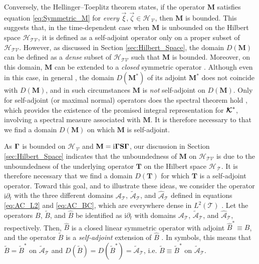 \documentclass[11pt]{amsart}
\newcommand{\I}{\mathrm{i}}
\newcommand{\Mb}{\mathbf{M}}
\newcommand{\Tb}{\mathbf{T}}
\newcommand{\Sb}{\mathbf{S}}
\newcommand\Kbc{\mbox{\boldmath${\mathcal{K}}$}}
\newcommand{\Tc}{\mathcal{T}}
\newcommand{\Vc}{\mathcal{V}}
\newcommand{\Hs}{\mathscr{H}}
\newcommand{\As}{\mathscr{A}}
\newcommand\bGamma{\mbox{\boldmath${\Gamma}$}}
\begin{document}
Conversely, the Hellinger--Toeplitz theorem \cite{Reed-1980} states,
if the operator $\Mb$ satisfies equation \eqref{eq:Symmetric_M} for
\emph{every} $\vec{\xi},\vec{\zeta}\in\Hs_{\,\Vc}$, then $\Mb$ is
bounded. This suggests that, in the time-dependent case when $\Mb$ is
unbounded on the Hilbert space $\Hs_{\Tc\Vc}$, it is defined as a
self-adjoint operator only on a proper subset of
$\Hs_{\Tc\Vc}$. However, as discussed in 
Section \ref{sec:Hilbert_Space}, the domain $D(\Mb)$ can be defined as
a \emph{dense} subset of $\Hs_{\Tc\Vc}$ such that $\Mb$ is
bounded. Moreover, on this domain, $\Mb$ can be extended to a 
\emph{closed} symmetric operator \cite{Reed-1980,Stone:64}. Although
even in this case, in general \cite{Reed-1980}, the domain $D(\Mb^*)$
of its adjoint $\Mb^*$ does not coincide with $D(\Mb)$, and in such
circumstances $\Mb$ is \emph{not} self-adjoint on $D(\Mb)$. Only for
self-adjoint (or maximal normal) operators does the spectral theorem hold
\cite{Reed-1980}, which provides the existence of the promised
integral representation for $\Kbc^*$, involving a spectral measure
associated with $\Mb$. It is therefore necessary to that we find a
domain $D(\Mb)$ on which $\Mb$ is self-adjoint.




As $\bGamma$ is bounded on $\Hs_{\,\Vc}$ and
$\Mb=\I\bGamma\Sb\bGamma$, our discussion in Section
\ref{sec:Hilbert_Space} indicates that the unboundedness of $\Mb$ on
$\Hs_{\Tc\Vc}$ is due to the unboundedness of the underlying operator
$\Tb$ on the Hilbert space $\Hs_{\,\Tc}$. It is therefore necessary
that we find a domain $D(\Tb)$ for which $\Tb$ is a self-adjoint
operator. Toward this goal, and to illustrate these ideas, we consider
the operator $\I\partial_t$ with the three different domains $\As_{\Tc}$,
$\tilde{\As}_{\Tc}$, and $\hat{\As}_{\Tc}$ defined in equations
\eqref{eq:AC_L2} and \eqref{eq:AC_BC}, which are everywhere dense in
$L^2(\Tc)$ \cite{Stone:64}. Let the operators $B$, $\tilde{B}$, and
$\hat{B}$ be identified as $\I\partial_t$ with domains $\As_{\Tc}$,
$\tilde{\As}_{\Tc}$, and $\hat{\As}_{\Tc}$, respectively. Then,
$\hat{B}$ is a closed linear symmetric operator with adjoint
$\hat{B}^*\equiv B$, and the operator $\tilde{B}$ is a \emph{self-adjoint}
extension of $\hat{B}$ \cite{Stone:64}. In symbols, this means that 
$\tilde{B}=\tilde{B}^*$ on $\tilde{\As}_{\Tc}$ and
$D(\tilde{B})=D(\tilde{B}^*)=\tilde{\As}_{\Tc}$,
i.e. $\tilde{B}\equiv\tilde{B}^*$ on $\tilde{\As}_{\Tc}$.     
\end{document}
